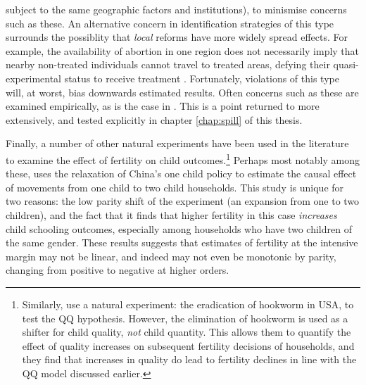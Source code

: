 subject to the same geographic factors and institutions), to minismise concerns 
such as these. An alternative concern in identification strategies of this type 
surrounds the possiblity that \emph{local} reforms have more widely spread
effects.  For example, the availability of abortion in one region does not
necessarily imply that nearby non-treated individuals cannot travel to
treated areas, defying their quasi-experimental status to receive treatment 
\citep{Levineetal1999}. Fortunately, violations of this type will, at worst, 
bias downwards estimated results. Often concerns such as these are examined
empirically, as is the case in \citet{Christensen2012}.  This is a point 
returned to more extensively, and tested explicitly in chapter 
\ref{chap:spill} of this thesis.

Finally, a number of other natural experiments have been used in the 
literature to examine the effect of fertility on child outcomes.\footnote{
Similarly, \citet{BleakleyLange2009} use a natural experiment: the eradication
of hookworm in USA, to test the QQ hypothesis.  However, the elimination of
hookworm is used as a shifter for child quality, \emph{not} child quantity.
This allows them to quantify the effect of quality increases on subsequent
fertility decisions of households, and they find that increases in quality
do lead to fertility declines in line with the QQ model discussed earlier.}
Perhaps most notably among these, \citet{Qian2009} uses the relaxation of 
China's one child policy to estimate the causal effect of movements from one 
child to two child households.  This study is unique for two reasons: the low 
parity shift of the experiment (an expansion from one to two children), and the 
fact that it finds that higher fertility in this case \emph{increases} child 
schooling outcomes, especially among households who have two children of the 
same gender. These results suggests that estimates of fertility at the intensive 
margin may not be linear, and indeed may not even be monotonic by parity, 
changing from positive to negative at higher orders.

